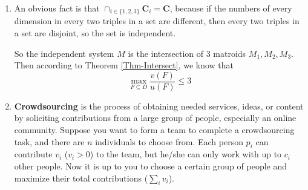 \documentclass[12pt,a4paper]{article}
\makeatletter
\newtheorem*{solution}{Solution}
\theoremstyle{definition}
\renewenvironment{solution}[1][Solution] {\par\pushQED{\qed}\normalfont\topsep6\p@\@plus6\p@\relax\trivlist\item[\hskip\labelsep\bfseries#1\@addpunct{.}]\ignorespaces}{\popQED\endtrivlist\@endpefalse} \makeatother
\makeatother
\begin{document}
\begin{enumerate}
\begin{solution}
\begin{enumerate}
        An obvious fact is that $\cap_{i \in \{1,2,3\}} \mathbf{C}_i = \mathbf{C}$, because if the numbers of every dimension in every two triples in a set are different, then every two triples in a set are disjoint, so the set is independent.

        So the independent system $M$ is the intersection of $3$ matroids $M_1, M_2, M_3$. Then according to Theorem \ref{Thm-Intersect}, we know that
        \begin{displaymath}
        \max\limits_{F \subseteq D} \frac{v(F)}{u(F)} \leq 3
        \end{displaymath}
    \end{enumerate}
    \end{solution}
    \clearpage

	\item
	\textbf{Crowdsourcing} is the process of obtaining needed services, ideas, or content by soliciting contributions from a large group of people, especially an online community. Suppose you want to form a team to complete a crowdsourcing task, and there are $n$ individuals to choose from. Each person $p_i$ can contribute $v_i$ ($v_i > 0$) to the team, but he/she can only work with up to $c_i$ other people. Now it is up to you to choose a certain group of people and maximize their total contributions ($\sum_i{v_i}$).
	

\end{enumerate}
\end{document}
